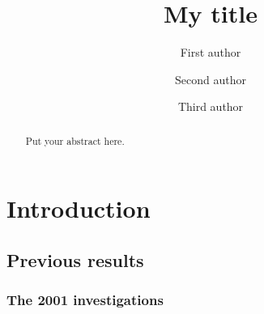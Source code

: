 \documentclass{elbioimp}
\title{My title}   %
\author{First author\affiliation{Institution of first author}\and
  Second author\affiliation{Institution of second author}\and
  Third author\affiliation{Institution of third author}}
\begin{document}
\maketitle


\begin{abstract}
  Put your abstract here.

\end{abstract}


\section{Introduction}   %
\subsection{Previous results}   %
\subsubsection{The 2001 investigations}   %





\end{document}
